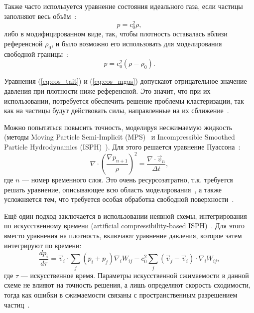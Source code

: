 Также часто используется уравнение состояния идеального газа, если частицы заполняют весь объём~\cite{Morris1997}:
%
\begin{equation}
    p = c_{0}^2 \rho,
\end{equation}
%
либо в модифицированном виде, так, чтобы плотность оставалась вблизи референсной $\rho_0$,
и было возможно его использовать для моделирования свободной границы~\cite{Desbrun1996, Muller2003, Federico2012,Peacock2014}:
%
\begin{equation}\label{eq:eos_mgas}
    p = c_{0}^2 (\rho - \rho_{0}).
\end{equation}

Уравнения (\ref{eq:eos_tait}) и (\ref{eq:eos_mgas}) допускают отрицательное значение давления при плотности ниже референсной. 
%
Это значит, что при их использовании, потребуется обеспечить решение проблемы кластеризации, так как на частицы
будут действовать силы, направленные на их сближение~\cite{Monaghan2000}.

Можно попытаться повысить точность, моделируя несжимаемую жидкость 
(методы Moving Particle Semi-Implicit (MPS)~\cite{Koshizuka1996, Premzoe2003, Liu2016} 
и Incompressible Smoothed Particle Hydrodynamics (ISPH)~\cite{Liu2016, Cummins1999, Rafiee2009, Bockmann2012}).
Для этого решается уравнение Пуассона~\cite{Ye2019}:
%
\begin{equation}
    \nabla \cdot\left( \frac{\nabla p_{n+1}}{\rho} \right)^{2} = \frac{\nabla \cdot \vec{v}_{n}}{\Delta t},
\end{equation}
%
где $n$ --- номер временного слоя.
%
Это очень ресурсозатратно, т.к. требуется решать уравнение, описывающее всю область моделирования~\cite{Liu2016}, 
а также усложняется тем, что требуется особая обработка свободной поверхности~\cite{Chen2013}.

Ещё один подход заключается в использовании неявной схемы, интегрирования по искусственному времени (artificial compressibility-based ISPH)~\cite{Rouzbahani2017}. 
Для этого вместо уравнения на плотность, включают уравнение давления, которое затем интегрируют по времени:
%
\begin{equation}
    \frac{d p_{i}}{d \tau} = \vec{v}_{i} \cdot \sum\limits_{j} (p_{i} + p_{j}) \nabla_{i}W_{ij}
    -
    c_{0}^{2} \sum\limits_{j} \left( \vec{v}_{j} - \vec{v}_{i} \right) \cdot \nabla_{i}W_{ij},
\end{equation}
%
где $\tau$ --- искусственное время.
%
Параметры искусственной сжимаемости в данной схеме не влияют на точность решения, 
а лишь определяют скорость сходимости, 
тогда как ошибки в сжимаемости связаны с пространственным разрешением частиц~\cite{Rouzbahani2017}.

